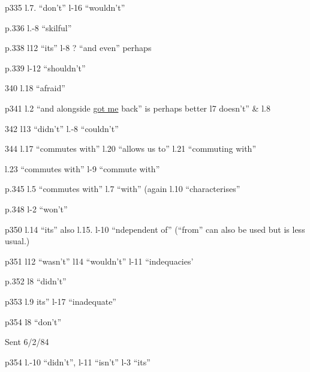 
p335 l.7. ``don't'' l-16 ``wouldn't''

p.336 l.-8 ``skilful''

p.338 l12 ``its'' l-8 ? ``and even'' perhaps

p.339 l-12 ``shouldn't'' 

340 l.18 ``afraid''

p341 l.2 ``and alongside \uline{got me} back'' is perhaps better l7 doesn't'' \& l.8

342 l13 ``didn't'' l.-8 ``couldn't''

344 l.17 ``commutes with'' l.20 ``allows us to'' l.21 ``commuting with''

l.23 ``commutes with'' l-9 ``commute with''

p.345 l.5 ``commutes with'' l.7 ``with'' (again l.10 ``characterises''

p.348 l-2 ``won't''

p350 l.14 ``its'' also  l.15. l-10 ``ndependent of'' (``from'' can also be used but is less usual.)

p351 l12 ``wasn't'' l14 ``wouldn't'' l-11 ``indequacies'

p.352 l8 ``didn't''

p353 l.9 its'' l-17 ``inadequate''

p354 l8 ``don't''

Sent 6/2/84


p354 l.-10 ``didn't'', l-11 ``isn't'' l-3 ``its''

